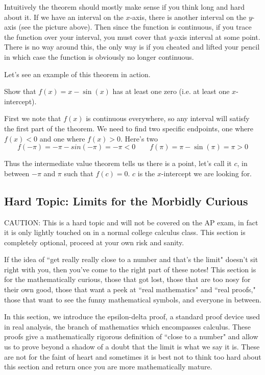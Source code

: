 Intuitively the theorem should mostly make sense if you think long and hard about it. If we have an interval on the $x$-axis, there is another interval on the $y$-axis (see the picture above). Then since the function is continuous, if you trace the function over your interval, you must cover that $y$-axis interval at some point. There is no way around this, the only way is if you cheated and lifted your pencil in which case the function is obviously no longer continuous.

Let's see an example of this theorem in action.
\begin{example}
	Show that $f(x) = x - \sin(x)$ has at least one zero (i.e. at least one $x$-intercept). 
	
	First we note that $f(x)$ is continuous everywhere, so any interval will satisfy the first part of the theorem. We need to find two specific endpoints, one where $f(x) < 0$ and one where $f(x) > 0$. Here's two
	\[ f(-\pi) = -\pi - sin(-\pi) = -\pi < 0 \qquad f(\pi) = \pi - \sin(\pi) = \pi > 0 \]
	
	Thus the intermediate value theorem tells us there is a point, let's call it $c$, in between $-\pi$ and $\pi$ such that $f(c) = 0$. $c$ is the $x$-intercept we are looking for.
\end{example}

\newpage 
\subsection{Hard Topic: Limits for the Morbidly Curious}
\bigskip
\begin{mdframed}[linewidth=1pt]
CAUTION: This is a hard topic and will not be covered on the AP exam, in fact it is only lightly touched on in a normal college calculus class. This section is completely optional, proceed at your own risk and sanity.
\end{mdframed}

If the idea of ``get really really close to a number and that's the limit" doesn't sit right with you, then you've come to the right part of these notes! This section is for the mathematically curious, those that got lost, those that are too nosy for their own good, those that want a peek at ``real mathematics" and ``real proofs," those that want to see the funny mathematical symbols, and everyone in between.

In this section, we introduce the epsilon-delta proof, a standard proof device used in real analysis, the branch of mathematics which encompasses calculus. These proofs give a mathematically rigorous definition of ``close to a number" and allow us to prove beyond a shadow of a doubt that the limit is what we say it is. These are not for the faint of heart and sometimes it is best not to think too hard about this section and return once you are more mathematically mature.

